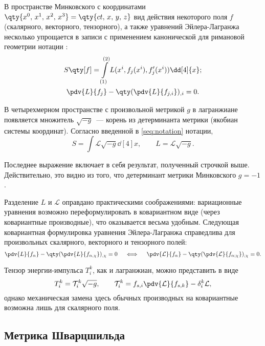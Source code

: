 \documentclass[\docroot/reports/draft/report.tex]{subfiles}
\begin{document}
    В пространстве Минковского с координатами $\qty{x^0,\,x^1,\,x^2,\,x^3} = \qty{ct,\,x,\,y,\,z}$ вид действия некоторого поля $f$ (скалярного, векторного, тензорного), а также уравнений Эйлера-Лагранжа несколько упрощается в записи с применением канонической для римановой геометрии нотации \cite{landau_v1,riemannian_geometry_and_tensor_analysis}:
    \begin{gather*}
        S\qty[f] = \int\limits_{(1)}^{(2)} L(x^i, f_j(x^i), f'_j(x^i)) \dd[4]{x}; \\
        \pdv{L}{f_j} - \qty(\pdv{L}{f_{j,i}})_{,i} = 0 .
    \end{gather*}

    В четырехмерном пространстве с произвольной метрикой $g$ в лагранжиане появляется множитель $\sqrt{-g}$~--- корень из детерминанта метрики (якобиан системы координат). Согласно введенной в \autoref{seq:notation} нотации,
    \begin{equation*}
        S = \int \mathcal{L} \sqrt{-g}\dd[4]{x}, \qquad L = \mathcal{L} \sqrt{-g} .
    \end{equation*}

    Последнее выражение включает в себя результат, полученный строчкой выше. Действительно, это видно из того, что детерминант метрики Минковского $g = -1$.

    Разделение $L$ и $\mathcal{L}$ оправдано практическими соображениями: вариационные уравнения возможно переформулировать в ковариантном виде (через ковариантные производные), что оказывается весьма удобным. Следующая ковариантная формулировка уравнения Эйлера-Лагранжа справедлива для произвольных скалярного, векторного и тензорного полей:
    \begin{equation*}
        \pdv{L}{f_{\alpha}} - \qty(\pdv{L}{f_{\alpha,\chi}})_{,\chi} = 0 \quad\iff\quad
        \pdv{\mathcal{L}}{f_{\alpha}} - \qty(\pdv{\mathcal{L}}{f_{\alpha;\chi}})_{;\chi} = 0 .
    \end{equation*}

    Тензор энергии-импульса $T_i^k$, как и лагранжиан, можно представить в виде
    \begin{equation*}
        T_i^k = \mathcal{T}_i^k \sqrt{-g}, \qquad \mathcal{T}_i^k = f_{s,i} \pdv{\mathcal{L}}{f_{s,k}} - \delta_i^k \mathcal{L},
    \end{equation*}
    однако механическая замена здесь обычных производных на ковариантные возможна лишь для скалярного поля.

\subsection{Метрика Шварцшильда}
\end{document}
